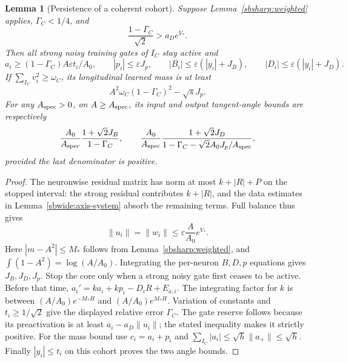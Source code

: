 \documentclass[10pt]{article}
\newtheorem{lemma}[theorem]{Lemma}
\theoremstyle{remark}\newtheorem{remark}[theorem]{Remark}
\begin{document}
\begin{lemma}[Persistence of a coherent cohort]
\label{sbwide:core-holding}
Suppose Lemma~\ref{sbsharp:weighted} applies, $\Gamma_C<1/4$, and
\[
 \frac{1-\Gamma_C}{\sqrt2}>a_De^{V_*}.
\]
Then all strong noisy training gates of $I_C$ stay active and
\[
 a_i\ge(1-\Gamma_C)A\varepsilon t_i/A_0,\qquad
 |p_i|\le\varepsilon J_p,\qquad
 |B_i|\le\varepsilon(|y_i|+J_B),\qquad
 |D_i|\le\varepsilon(|y_i|+J_D).
\]
If $\sum_{I_C}v_i^2\ge\omega_C$, its longitudinal learned mass is at least
\begin{equation}\label{sbwide:core-mass}
 A^2\omega_C(1-\Gamma_C)^2-\sqrt{s}J_p.
\end{equation}
For any $A_{\rm spec}>0$, on $A\ge A_{\rm spec}$, its input and output tangent-angle bounds are
respectively
\[
 \frac{A_0}{A_{\rm spec}}
 \frac{1+\sqrt2J_B}{1-\Gamma_C},\qquad
 \frac{A_0}{A_{\rm spec}}
 \frac{1+\sqrt2J_D}
 {1-\Gamma_C-\sqrt2 A_0J_p/A_{\rm spec}},
\]
provided the last denominator is positive.
\end{lemma}
\begin{proof}
The neuronwise residual matrix has norm at most
$k+|R|+P$ on the stopped interval: the strong residual contributes
$k+|R|$, and the data estimates in
Lemma~\ref{sbwide:axis-system} absorb the remaining terms.
Full balance thus gives
\[
 \|u_i\|=\|w_i\|\le\varepsilon\frac A{A_0}e^{V_*}.
\]
Here $|m-A^2|\le M_*$ follows from Lemma~\ref{sbsharp:weighted},
and $\int(1-A^2)=\log(A/A_0)$.
Integrating the per-neuron $B,D,p$ equations gives $J_B,J_D,J_p$.
Stop the core only when a strong noisy gate first ceases to be active.
Before that time,
$a_i'=ka_i+kp_i-D_iR+E_{a,i}$.
The integrating factor for $k$ is between
$(A/A_0)e^{-M_*H}$ and $(A/A_0)e^{M_*H}$.
Variation of constants and $t_i\ge1/\sqrt2$ give the displayed
relative error $\Gamma_C$.
The gate reserve follows because its preactivation is at least
$a_i-a_D\|u_i\|$; the stated inequality makes it strictly positive.
For the mass bound use $c_i=a_i+p_i$ and
$\sum_{I_C}|a_i|\le\sqrt h\|a_+\|\le\sqrt h$.
Finally $|y_i|\le t_i$ on this cohort proves the two angle bounds.
\end{proof}
\end{document}
